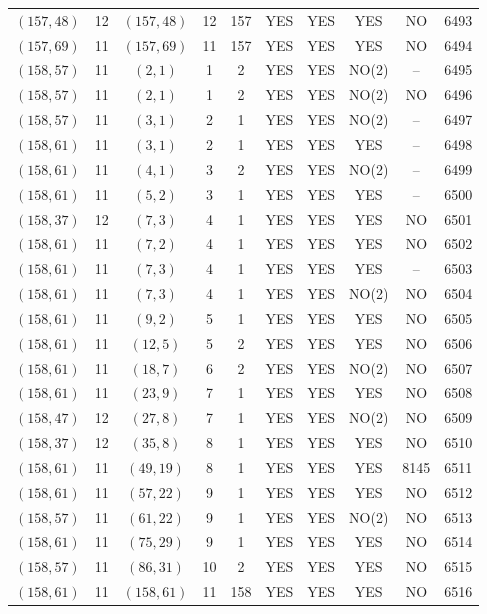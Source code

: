 \begin{longtable}{|c|c|c|c|c|c|c|c|c|c|}
$(157, 48)$ & 12 & $(157, 48)$ & 12 & 157 & YES & YES & YES & NO & 6493\\
$(157, 69)$ & 11 & $(157, 69)$ & 11 & 157 & YES & YES & YES & NO & 6494\\
$(158, 57)$ & 11 & $(2, 1)$ & 1 & 2 & YES & YES & NO(2) & -- & 6495\\
$(158, 57)$ & 11 & $(2, 1)$ & 1 & 2 & YES & YES & NO(2) & NO & 6496\\
$(158, 57)$ & 11 & $(3, 1)$ & 2 & 1 & YES & YES & NO(2) & -- & 6497\\
$(158, 61)$ & 11 & $(3, 1)$ & 2 & 1 & YES & YES & YES & -- & 6498\\
$(158, 61)$ & 11 & $(4, 1)$ & 3 & 2 & YES & YES & NO(2) & -- & 6499\\
$(158, 61)$ & 11 & $(5, 2)$ & 3 & 1 & YES & YES & YES & -- & 6500\\
$(158, 37)$ & 12 & $(7, 3)$ & 4 & 1 & YES & YES & YES & NO & 6501\\
$(158, 61)$ & 11 & $(7, 2)$ & 4 & 1 & YES & YES & YES & NO & 6502\\
$(158, 61)$ & 11 & $(7, 3)$ & 4 & 1 & YES & YES & YES & -- & 6503\\
$(158, 61)$ & 11 & $(7, 3)$ & 4 & 1 & YES & YES & NO(2) & NO & 6504\\
$(158, 61)$ & 11 & $(9, 2)$ & 5 & 1 & YES & YES & YES & NO & 6505\\
$(158, 61)$ & 11 & $(12, 5)$ & 5 & 2 & YES & YES & YES & NO & 6506\\
$(158, 61)$ & 11 & $(18, 7)$ & 6 & 2 & YES & YES & NO(2) & NO & 6507\\
$(158, 61)$ & 11 & $(23, 9)$ & 7 & 1 & YES & YES & YES & NO & 6508\\
$(158, 47)$ & 12 & $(27, 8)$ & 7 & 1 & YES & YES & NO(2) & NO & 6509\\
$(158, 37)$ & 12 & $(35, 8)$ & 8 & 1 & YES & YES & YES & NO & 6510\\
$(158, 61)$ & 11 & $(49, 19)$ & 8 & 1 & YES & YES & YES & 8145 & 6511\\
$(158, 61)$ & 11 & $(57, 22)$ & 9 & 1 & YES & YES & YES & NO & 6512\\
$(158, 57)$ & 11 & $(61, 22)$ & 9 & 1 & YES & YES & NO(2) & NO & 6513\\
$(158, 61)$ & 11 & $(75, 29)$ & 9 & 1 & YES & YES & YES & NO & 6514\\
$(158, 57)$ & 11 & $(86, 31)$ & 10 & 2 & YES & YES & YES & NO & 6515\\
$(158, 61)$ & 11 & $(158, 61)$ & 11 & 158 & YES & YES & YES & NO & 6516\\

\end{longtable}
